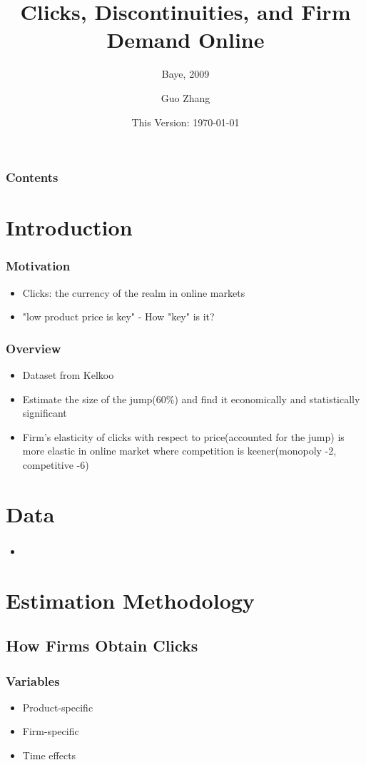 \documentclass{beamer}
\title{Clicks, Discontinuities, and Firm Demand Online}
\subtitle{Baye, 2009}
\author{Guo Zhang}
\institute[Universities of]
{
WISE, Xiamen University
}
\date{This Version: \today}
\begin{document}
\begin{frame}[plain]
\titlepage
\end{frame}

\begin{frame}[plain] %
\frametitle{Contents}
\begin{multicols}{2}
  \tableofcontents
\end{multicols}
\end{frame}

\section{Introduction}
\begin{frame}
\frametitle{Motivation}
\begin{itemize}
\item Clicks: the currency of the realm in online markets
\item "low product price is key" - How "key" is it?
\end{itemize}
\end{frame}

\begin{frame}
\frametitle{Overview}
\begin{itemize}
\item Dataset from Kelkoo
\item Estimate the size of the jump(60\%) and find it economically and statistically significant
\item Firm's elasticity of clicks with respect to price(accounted for the jump) is more elastic in online market where competition is keener(monopoly -2, competitive -6)
\end{itemize}
\end{frame}

\section{Data}
\begin{frame}
\frametitle{}
\begin{itemize}
\item 
\end{itemize}
\end{frame}

\section{Estimation Methodology}
\subsection{How Firms Obtain Clicks}
\begin{frame}
\frametitle{Variables}
\begin{itemize}
\item Product-specific
\item Firm-specific
\item Time effects
\end{itemize}
\end{frame}
\end{document}

